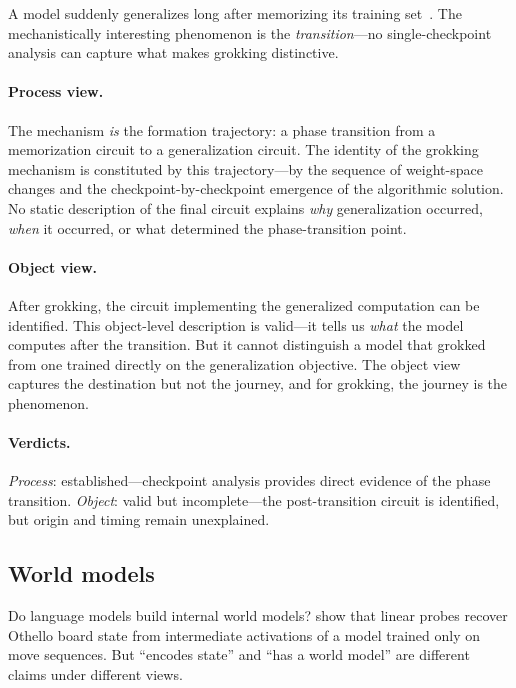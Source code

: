 \documentclass{article}
\begin{document}
A model suddenly generalizes long after memorizing its training
set~\citep{power2022grokking, nanda2023grokking}. The mechanistically
interesting phenomenon is the \emph{transition}---no single-checkpoint
analysis can capture what makes grokking distinctive.

\paragraph{Process view.}
The mechanism \emph{is} the formation trajectory: a phase transition from
a memorization circuit to a generalization circuit. The identity of the
grokking mechanism is constituted by this trajectory---by the sequence of
weight-space changes and the checkpoint-by-checkpoint emergence of the
algorithmic solution. No static description of the final circuit explains
\emph{why} generalization occurred, \emph{when} it occurred, or what
determined the phase-transition point.

\paragraph{Object view.}
After grokking, the circuit implementing the generalized computation can
be identified. This object-level description is valid---it tells us
\emph{what} the model computes after the transition. But it cannot
distinguish a model that grokked from one trained directly on the
generalization objective. The object view captures the destination but
not the journey, and for grokking, the journey is the phenomenon.

\paragraph{Verdicts.}
\emph{Process}: established---checkpoint analysis provides direct
evidence of the phase transition.
\emph{Object}: valid but incomplete---the post-transition circuit is
identified, but origin and timing remain unexplained.


\subsection{World models}\label{app:cs_world}

Do language models build internal world models?
\citet{li2022othello} show that linear probes recover Othello board
state from intermediate activations of a model trained only on move
sequences. But ``encodes state'' and ``has a world model'' are
different claims under different views.
\end{document}
